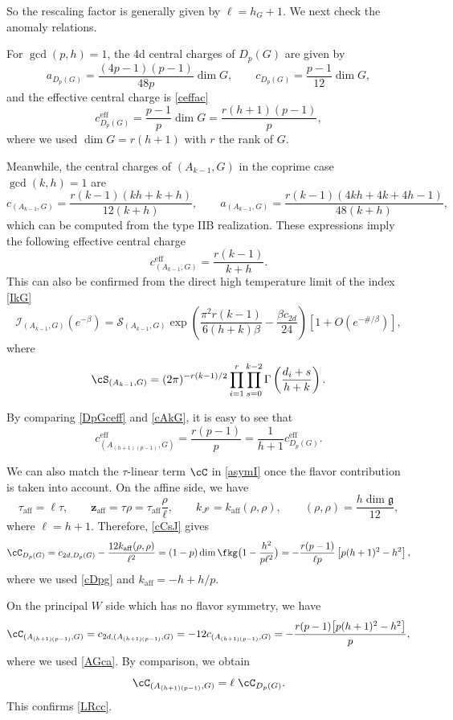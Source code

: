 \documentclass[a4paper,11pt]{article}
\theoremstyle{definition}
\theoremstyle{definition}
\theoremstyle{remark}
\newcommand{\ceff}{c^\text{eff}}
\newcommand{\be}{\begin{equation}}
\newcommand{\ee}{\end{equation}}
\begin{document}
So the rescaling factor is generally given by $
\ell={h_G+1}.
$
We next check the anomaly relations.

For $ \gcd(p,h)=1$, the  4d central charges of $D_p(G)$ are given by     \cite{Cecotti:2013lda}
\be
a_{D_p(G)}
=
\frac{(4p-1)(p-1)}{48p}\dim G,
\qquad
c_{D_p(G)}
=
\frac{p-1}{12}\dim G, \label{cDpg}
\ee
and the effective central charge is \eqref{ceffac}
\be\label{DpGceff}
 \ceff _{D_p(G)}  = \frac{p-1}{p} \dim G =\frac{r(h+1) (p-1)}{p} ,
\ee 
where we used
 $ \dim G=r(h+1)$ with $r$ the rank of $G$.
 
Meanwhile, the  central charges of $(A_{k-1},G)$ in the coprime case   $\gcd(k,h)=1$  are
%
\be\label{AGca}
c_{(A_{k-1}, G)} = \frac{r(k - 1)(kh + k + h)}{12(k + h)}, \qquad
a_{(A_{k-1}, G)} = \frac{r(k - 1)(4kh + 4k + 4h - 1)}{48(k + h)},
\ee
which can be computed from the type IIB realization. These expressions  imply the following effective central charge
\be\label{cAkG}
\ceff_{(A_{k-1}, G)} 
  = \frac{r(k - 1)}{k + h}.
\ee
 This can also be confirmed from the direct   high temperature limit of the index  \eqref{IkG}
\be
\mathcal I_{(A_{k-1},G)}(e^{-\beta})
 =\mathcal S_{(A_{k-1},G)}
 \exp\!\left(\frac{\pi^2r(k-1)}{6(h+k)\beta}
              -\frac{\beta c_{2d}}{24}\right)
 \left[1+O(e^{-\#/\beta})\right] ,
\ee
where
\be \cS_{(A_{k-1}, G)} = (2\pi)^{-r(k-1)/2} \prod_{i=1}^r \prod_{s=0}^{k-2} \Gamma\left( \frac{d_i + s}{h + k} \right). 
\ee

  
 By comparing \eqref{DpGceff} and \eqref{cAkG}, it is easy to see that 
\be
\ceff_{( A_{(h+1)(p-1)},G)}= \frac{r(p-1)}{p}= \frac{1}{h+1}\ceff_{D_p(G)}.
\ee

 
We can also match the  $\tau$-linear term $\cC$  in \eqref{asymI} once the flavor contribution is taken into account.  
On the affine side, we have 
\be
\tau_{\mathrm{aff}}=\ell\tau,\qquad \bm z_{\mathrm{aff}}=\tau\rho=\tau_{\mathrm{aff}}\frac{\rho}{\ell},\qquad
k_{J^\rho}= k_{\mathrm{aff}}(\rho,\rho) ,\qquad
(\rho,\rho)=\frac{h\dim\mathfrak g}{12},
\ee
where $\ell=h+1$. 
Therefore,  \eqref{cCsJ}  gives
\be
\cC_{D_p(G)}=c_{2d,D_p(G)}-\frac{12k_{\mathrm{aff}}(\rho,\rho)}{\ell^2}
=(1-p)\dim\fkg\big( 1-\frac{h^2}{p\ell^2}\big) 
=-\frac{r(p-1) }{\ell p}\left[p(h+1)^2-h^2\right],
\ee
where  we used \eqref{cDpg} and $k_{\mathrm{aff}}=-h+h/p$.


On the principal $W$ side which has no flavor symmetry, we have
\be
\cC_{(A_{(h+1)(p-1)}, G)} =c_{2d,(A_{(h+1)(p-1)}, G)}  =-12c_{ (A_{(h+1)(p-1)}, G)} = -\frac{r(p-1) \big[p(h+1)^2 - h^2\big]}{p},
\ee
where we used \eqref{AGca}.  By comparison,  we obtain
\be
\cC_{(A_{(h+1)(p-1)}, G)} =\ell\;\cC_{D_p(G)}.
\ee
This confirms \eqref{LRcc}. 
\end{document}
